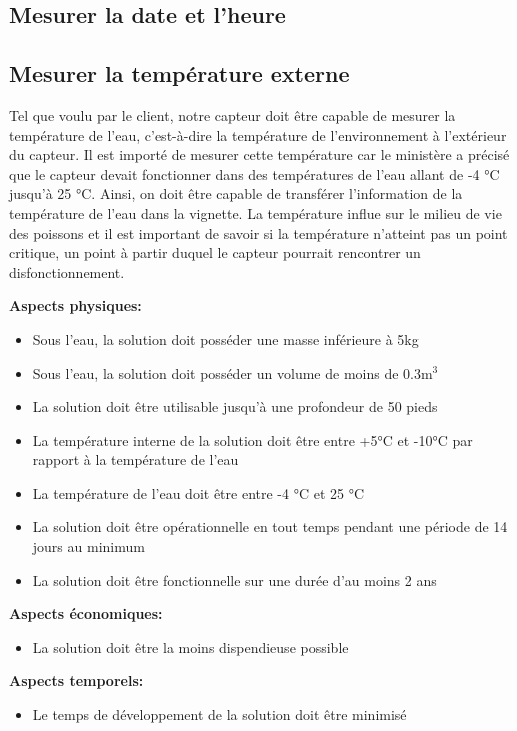 \subsection{Mesurer la date et l'heure}

\subsection{Mesurer la température externe} 
Tel que voulu par le client, notre capteur doit être capable de mesurer la température de l’eau, c’est-à-dire la température de l’environnement à l’extérieur du capteur. Il est importé de mesurer cette température car le ministère a précisé que le capteur devait fonctionner dans des températures de l’eau allant de -4 °C jusqu’à 25 °C. Ainsi, on doit être capable de transférer l’information de la température de l’eau dans la vignette. La température influe sur le milieu de vie des poissons et il est important de savoir si la température n’atteint pas un point critique, un point à partir duquel le capteur pourrait rencontrer un disfonctionnement. 

\textbf{Aspects physiques:}
\begin{itemize}[label = {--}]
    \item Sous l'eau, la solution doit posséder une masse inférieure à 5kg
    \item Sous l'eau, la solution doit posséder un volume de moins de 0.3m$^3$
    \item La solution doit être utilisable jusqu'à une profondeur de 50 pieds
    \item La température interne de la solution doit être entre +5°C et -10°C par rapport à la température de l'eau
    \item La température de l'eau doit être entre -4 °C et 25 °C
    \item La solution doit être opérationnelle en tout temps pendant une période de 14 jours au minimum
    \item La solution doit être fonctionnelle sur une durée d'au moins 2 ans
\end{itemize}

\textbf{Aspects économiques:}
\begin{itemize}[label = {--}]
    \item La solution doit être la moins dispendieuse possible
\end{itemize}

\textbf{Aspects temporels:}
\begin{itemize}[label = {--}]
    \item Le temps de développement de la solution doit être minimisé
\end{itemize}

